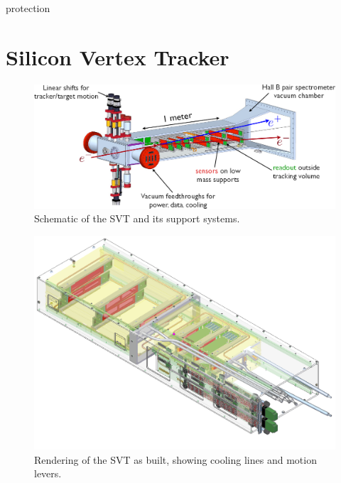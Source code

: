 protection

\section{Silicon Vertex Tracker}
\begin{figure}[ht]
    \includegraphics[width=\textwidth]{detector/figs/svt_cutaway}
    \caption{Schematic of the SVT and its support systems.}
    \label{figure:svt_layout}
\end{figure}

\begin{figure}[ht]
    \includegraphics[width=\textwidth]{detector/figs/svt_drawing}
    \caption{Rendering of the SVT as built, showing cooling lines and motion levers.}
    \label{figure:svt_layout}
\end{figure}

